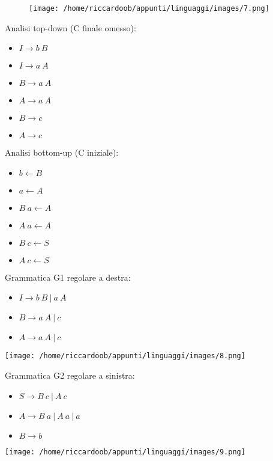 \begin{figure}[H]
    \centering
    \texttt{[image: /home/riccardoob/appunti/linguaggi/images/7.png]}
\end{figure}

\begin{multicols}{2}
\noindent
Analisi top-down (C finale omesso):
\begin{itemize}
    \item $I \rightarrow b\ B$
    \item $I \rightarrow a\ A$
    \item $B \rightarrow a\ A$
    \item $A \rightarrow a\ A$
    \item $B \rightarrow c$
    \item $A \rightarrow c$
\end{itemize}

\columnbreak
\noindent
Analisi bottom-up (C iniziale):
\begin{itemize}
    \item $b \leftarrow  B$
    \item $a \leftarrow  A$
    \item $B\ a \leftarrow  A$
    \item $A\ a \leftarrow  A$
    \item $B\ c \leftarrow  S$
    \item $A\ c \leftarrow  S$
\end{itemize}
\end{multicols}
\setlist{}

\begin{multicols}{2}
\noindent
Grammatica G1 regolare a destra:
\begin{itemize}
    \item $I \rightarrow b\ B\ |\ a\ A$
    \item $B \rightarrow a\ A\ |\ c$
    \item $A \rightarrow a\ A\ |\ c$
\end{itemize}
\begin{multicolfigure}
    \centering
    \texttt{[image: /home/riccardoob/appunti/linguaggi/images/8.png]}
\end{multicolfigure}
\columnbreak
\noindent
Grammatica G2 regolare a sinistra:
\begin{itemize}
    \item $S \rightarrow B\ c\ |\ A\ c$
    \item $A \rightarrow B\ a\ |\ A\ a\ |\  a$
    \item $B \rightarrow b$
\end{itemize}
\begin{multicolfigure}
    \centering
    \texttt{[image: /home/riccardoob/appunti/linguaggi/images/9.png]}
\end{multicolfigure}    
\end{multicols}

